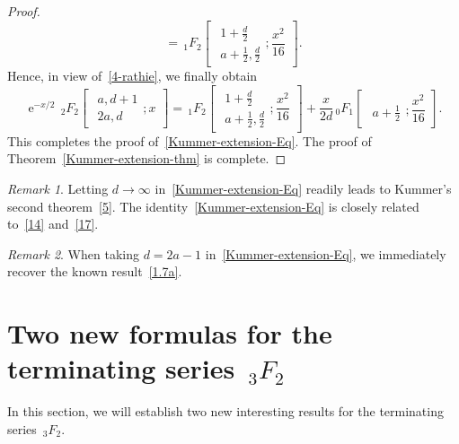 \documentclass[reqno]{amsart}
\numberwithin{equation}{section}
\theoremstyle{plain}
\theoremstyle{remark}
\newtheorem{rem}{Remark}[section]
\DeclareMathOperator{\te}{e}
\begin{document}
\begin{proof}
\begin{equation*}
={\,}_1F_2\begin{bmatrix}
 \begin{gathered}
 1+\tfrac{d}{2}\\ a+\tfrac12,\tfrac{d}{2}
 \end{gathered};\dfrac{x^2}{16}
\end{bmatrix}.
\end{equation*}
Hence, in view of~\eqref{4-rathie}, we finally obtain
\begin{equation*}
\te^{-x/2}{\,}_2F_2\begin{bmatrix}
 \begin{gathered}a,d+1\\ 2a, d\end{gathered};x
\end{bmatrix}
={\,}_1F_2\begin{bmatrix}
 \begin{gathered}
 1+\tfrac{d}{2}\\a+\tfrac{1}{2},\tfrac{d}{2}
 \end{gathered};\dfrac{x^2}{16}
\end{bmatrix}
+\frac{x}{2d}{\,}_0F_1\begin{bmatrix}
 \begin{gathered}
 \\a+\tfrac{1}{2}
 \end{gathered};\dfrac{x^2}{16}
\end{bmatrix}.
\end{equation*}
This completes the proof of~\eqref{Kummer-extension-Eq}. The proof of Theorem~\ref{Kummer-extension-thm} is complete.
\end{proof}

\begin{rem}
Letting $d\to\infty$ in~\eqref{Kummer-extension-Eq} readily leads to Kummer's second theorem~\eqref{5}. The identity~\eqref{Kummer-extension-Eq} is closely related to~\eqref{14} and~\eqref{17}.
\end{rem}

\begin{rem}
When taking $d=2a-1$ in~\eqref{Kummer-extension-Eq}, we immediately recover the known result~\eqref{1.7a}.
\end{rem}

\section{Two new formulas for the terminating series ${\,}_3F_2$}
In this section, we will establish two new interesting results for the terminating series ${\,}_3F_2$.
\end{document}
